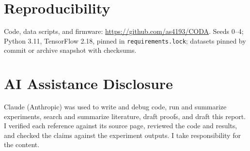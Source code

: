 \documentclass[conference]{IEEEtran}
\begin{document}
\section*{Reproducibility}
Code, data scripts, and firmware: \url{https://github.com/as4193/CODA}. Seeds 0--4; Python 3.11, TensorFlow 2.18, pinned in \texttt{requirements.lock}; datasets pinned by commit or archive snapshot with checksums.

\section*{AI Assistance Disclosure}
Claude (Anthropic) was used to write and debug code, run and summarize experiments, search and summarize literature, draft proofs, and draft this report. I verified each reference against its source page, reviewed the code and results, and checked the claims against the experiment outputs. I take responsibility for the content.

\balance


\end{document}
